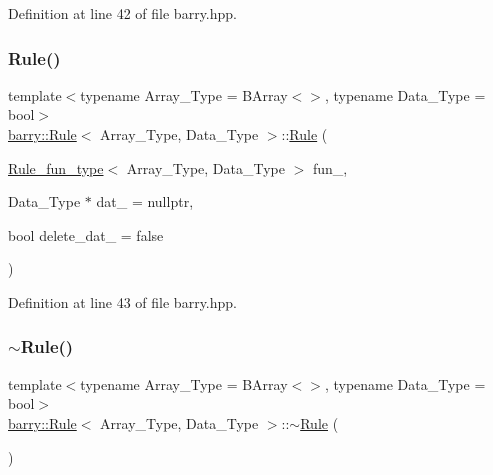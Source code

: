 Definition at line 42 of file barry.\+hpp.

\mbox{\label{classbarry_1_1_rule_a2d63309b0ff8cd5d2c4827b9daf03b3a}} 
\subsubsection{\texorpdfstring{Rule()}{Rule()}\hspace{0.1cm}{\footnotesize\ttfamily [2/2]}}
{\footnotesize\ttfamily template$<$typename Array\+\_\+\+Type  = B\+Array$<$$>$, typename Data\+\_\+\+Type  = bool$>$ \\
\hyperlink{classbarry_1_1_rule}{barry\+::\+Rule}$<$ Array\+\_\+\+Type, Data\+\_\+\+Type $>$\+::\hyperlink{classbarry_1_1_rule}{Rule} (\begin{DoxyParamCaption}\item[{\hyperlink{namespacebarry_a3b914cb0dafdd5e5c19d142e8fa96c92}{Rule\+\_\+fun\+\_\+type}$<$ Array\+\_\+\+Type, Data\+\_\+\+Type $>$}]{fun\+\_\+,  }\item[{Data\+\_\+\+Type $\ast$}]{dat\+\_\+ = {\ttfamily nullptr},  }\item[{bool}]{delete\+\_\+dat\+\_\+ = {\ttfamily false} }\end{DoxyParamCaption})\hspace{0.3cm}{\ttfamily [inline]}}



Definition at line 43 of file barry.\+hpp.

\mbox{\label{classbarry_1_1_rule_a5b56209f553a6fe5b841395eec8e3101}} 
\subsubsection{\texorpdfstring{$\sim$\+Rule()}{~Rule()}}
{\footnotesize\ttfamily template$<$typename Array\+\_\+\+Type  = B\+Array$<$$>$, typename Data\+\_\+\+Type  = bool$>$ \\
\hyperlink{classbarry_1_1_rule}{barry\+::\+Rule}$<$ Array\+\_\+\+Type, Data\+\_\+\+Type $>$\+::$\sim$\hyperlink{classbarry_1_1_rule}{Rule} (\begin{DoxyParamCaption}{ }\end{DoxyParamCaption})\hspace{0.3cm}{\ttfamily [inline]}}




